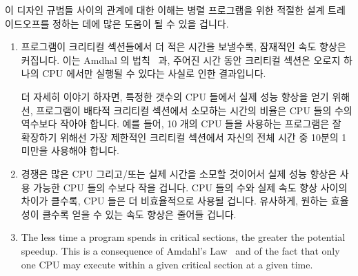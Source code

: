이 디자인 규범들 사이의 관계에 대한 이해는 병렬 프로그램을 위한 적절한 설계
트레이드오프를 정하는 데에 많은 도움이 될 수 있을 겁니다.
\iffalse

Note that these criteria may also appear as part of the requirements
specification.
For example, speedup may act as a relative desideratum
(``the faster, the better'')
or as an absolute requirement of the workload (``the system
must support at least 1,000,000 web hits per second'').
Classic design pattern languages describe relative desiderata as forces
and absolute requirements as context.

An understanding of the relationships between these design criteria can
be very helpful when identifying appropriate design tradeoffs for a
parallel program.
\fi
\begin{enumerate}
\item	프로그램이 크리티컬 섹션들에서 더 적은 시간을 보낼수록, 잠재적인 속도
	향상은 커집니다.
	이는 Amdhal 의 법칙~\cite{GeneAmdahl1967AmdahlsLaw} 과, 주어진 시간
	동안 크리티컬 섹션은 오로지 하나의 CPU 에서만 실행될 수 있다는 사실로
	인한 결과입니다.

	더 자세히 이야기 하자면, 특정한 갯수의 CPU 들에서 실제 성능 향상을 얻기
	위해선, 프로그램이 배타적 크리티컬 섹션에서 소모하는 시간의 비율은 CPU
	들의 수의 역수보다 작아야 합니다.
	예를 들어, 10 개의 CPU 들을 사용하는 프로그램은 잘 확장하기 위해선 가장
	제한적인 크리티컬 섹션에서 자신의 전체 시간 중 10분의 1 미만을 사용해야
	합니다.
\item	경쟁은 많은 CPU 그리고/또는 실제 시간을 소모할 것이어서 실제 성능
	향상은 사용 가능한 CPU 들의 수보다 작을 겁니다.
	CPU 들의 수와 실제 속도 향상 사이의 차이가 클수록, CPU 들은 더
	비효율적으로 사용될 겁니다.
	유사하게, 원하는 효율성이 클수록 얻을 수 있는 속도 향상은 줄어들
	겁니다.
\iffalse

\item	The less time a program spends in critical sections,
	the greater the potential speedup.
	This is a consequence of Amdahl's Law~\cite{GeneAmdahl1967AmdahlsLaw}
	and of the fact that only one CPU may execute within a given
	critical section at a given time.


\end{enumerate}
